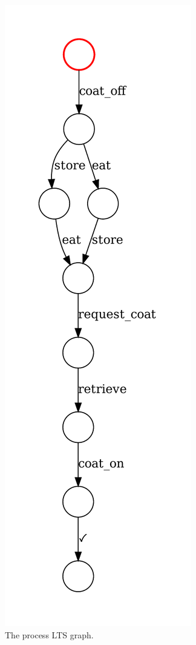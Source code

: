 \begin{figure}[htb]
	\caption{\label{lts-example}The process LTS graph.}
	\begin{center}
		\includegraphics[scale=0.5]{images/LTS.pdf}
	\end{center}
\end{figure}


